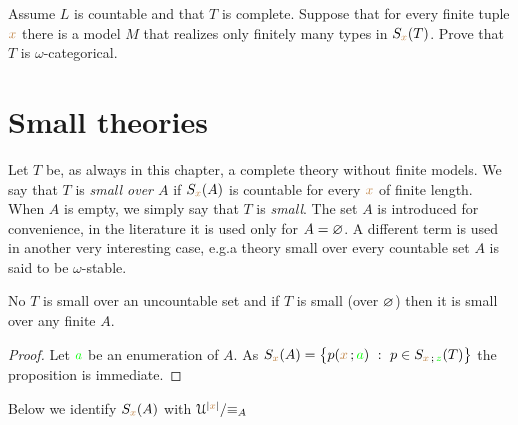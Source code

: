 \documentclass[creche.tex]{subfiles}
\begin{document}
\begin{exercise} 
Assume $L$ is countable and that $T$ is complete.
Suppose that for every finite tuple  ${\color{brown} x}$ there is a model $M$ that realizes only finitely many types in $S_{\color{brown} x}(T)$.
Prove that $T$ is $\omega$-categorical.\QED
\end{exercise}
\section{Small theories}

\def\ceq#1#2#3{\parbox[b]{15ex}{$\displaystyle #1$}\parbox[b]{6ex}{\hfil$#2$}$\displaystyle #3$}


Let $T$ be, as always in this chapter, a complete theory without finite models.
We say that $T$ is \emph{small over $A$\/} if $S_{{\color{brown} x}}(A)$ is countable for every ${\color{brown} x}$ of finite length.
When $A$ is empty, we simply say that $T$ is \emph{small}.
The set $A$ is introduced for convenience, in the literature it is used only for $A=\varnothing$.
A different term is used in another very interesting case, e.g.\@ a theory small over every countable set $A$ is said to be $\omega$-stable.


\begin{proposition}
No $T$ is small over an uncountable set and if $T$ is small (over $\varnothing$) then it is small over any finite $A$.
\end{proposition}

\begin{proof}
Let ${\color{green} a}$ be an enumeration of $A$.
As $S_{\mr x}(A)=\big\{p({\mr x}\,;{\gr a})\ :\ p\in S_{{\mr x}\,;\,{\gr z}}(T)\big\}$ the proposition is immediate.
\end{proof}

Below we identify $S_{\color{brown} x}(A)$ with $\EuScript U^{|{\color{brown} x}|}/\mathord\equiv_A$
\end{document}
